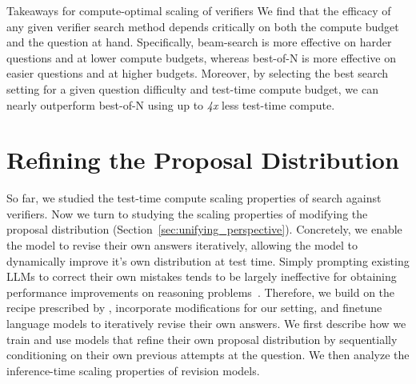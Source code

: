 \begin{AIbox}{Takeaways for compute-optimal scaling of verifiers}
We find that the efficacy of any given verifier search method depends critically on both the compute budget and the question at hand. Specifically, beam-search is more effective on harder questions and at lower compute budgets, whereas best-of-N is more effective on easier questions and at higher budgets. Moreover, by selecting the best search setting for a given question difficulty and test-time compute budget, we can nearly outperform best-of-N using up to \emph{4x} less test-time compute.
\end{AIbox}

\vspace{-0.2cm}
\section{Refining the Proposal Distribution}
\label{sec:revisions}
\vspace{-0.2cm}
So far, we studied the test-time compute scaling properties of search against verifiers. Now we turn to studying the scaling properties of modifying the proposal distribution (Section~\ref{sec:unifying_perspective}).
Concretely, we enable the model to revise their own answers iteratively, allowing the model to dynamically improve it's own distribution at test time. Simply prompting existing LLMs to correct their own mistakes tends to be largely ineffective for obtaining performance improvements on reasoning problems~\citep{huang2023large}. Therefore, we build on the recipe prescribed by \citet{qu2024recursive}, incorporate modifications for our setting, and finetune language models to iteratively revise their own answers. We first describe how we train and use models that refine their own proposal distribution by sequentially conditioning on their own previous attempts at the question. We then analyze the inference-time scaling properties of revision models.

